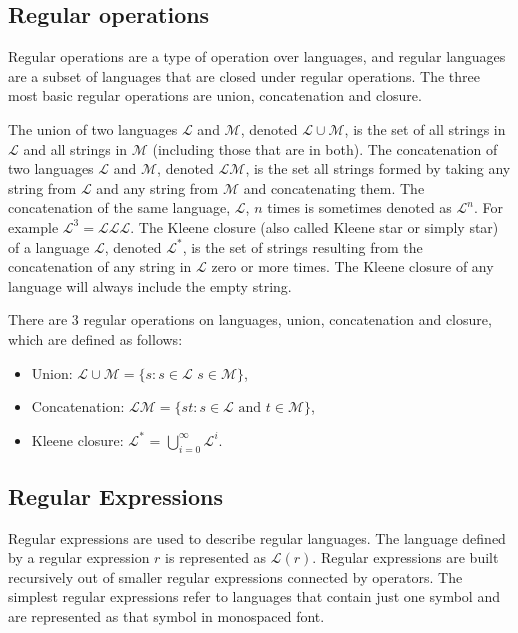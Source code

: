 \subsection{Regular operations}
Regular operations are a type of operation over languages, and regular languages are a subset of languages that are closed under regular operations. The three most basic regular operations are union, concatenation and closure.

The union of two languages \(\mathcal{L}\) and \(\mathcal{M}\), denoted \(\mathcal{L} \cup \mathcal{M}\), is the set of all strings in \(\mathcal{L}\) and all strings in \(\mathcal{M}\) (including those that are in both).
The concatenation of two languages \(\mathcal{L}\) and \(\mathcal{M}\), denoted \(\mathcal{L}\mathcal{M}\), is the set all strings formed by taking any string from \(\mathcal{L}\) and any string from \(\mathcal{M}\) and concatenating them. The concatenation of the same language, \(\mathcal{L}\), \(n\) times is sometimes denoted as \(\mathcal{L}^n\). For example  \(\mathcal{L}^3 = \mathcal{L}\mathcal{L}\mathcal{L}\).
The Kleene closure\footnotemark{} (also called Kleene star or simply star) of a language \(\mathcal{L}\), denoted \(\mathcal{L}^*\), is the set of strings resulting from the concatenation of any string in \(\mathcal{L}\) zero or more times. The Kleene closure of any language will always include the empty string.

\begin{definition} There are 3 regular operations on languages, union, concatenation and closure, which are defined as follows:
\begin{itemize}[nosep]
\item Union: \(\mathcal{L} \cup \mathcal{M} = \{s :s \in \mathcal{L}\)  \(s \in \mathcal{M}\}\),

\item Concatenation: \(\mathcal{L}\mathcal{M} =\{st : s \in \mathcal{L} \text{ and } t \in \mathcal{M}\}\),

\item Kleene closure: \(\mathcal{L}^*\) = \(\bigcup_{i=0}^\infty \mathcal{L}^i\).
\end{itemize}
\end{definition}

\subsection{Regular Expressions} \label{sec:regex}
Regular expressions are used to describe regular languages. The language defined by a regular expression \(r\) is represented as \(\mathcal{L}(r)\).
Regular expressions are built recursively out of smaller regular expressions connected by operators. The simplest regular expressions refer to languages that contain just one symbol and are represented as that symbol in monospaced font.

